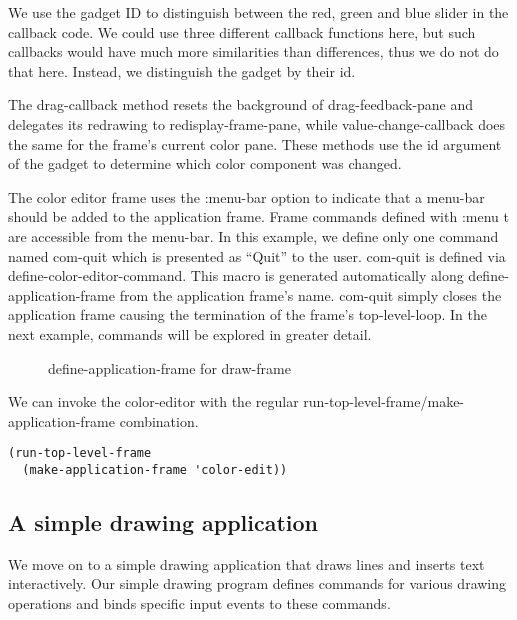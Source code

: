 \documentclass[twocolumn,a4paper]{article}
\newcommand {\code}[1]{{\sffamily #1}}
\let\class\code
\let\method\code
\let\variable\code
\let\macro\code
\let\keyword\code
\begin{document}
We use the gadget ID to distinguish between the red, green and blue
slider in the callback code. We could use three different callback
functions here, but such callbacks would have much more similarities
than differences, thus we do not do that here. Instead, we distinguish
the gadget by their \variable{id}.

The \method{drag-callback} method resets the background of
\variable{drag-feedback-pane} and delegates its redrawing to
\method{redisplay-frame-pane}, while \method{value-change-callback}
does the same for the frame's current color pane. These methods use
the \variable{id} argument of the gadget to determine which color
component was changed.

The color editor frame uses the \keyword{:menu-bar} option to indicate
that a menu-bar should be added to the application frame. Frame
commands defined with \code{:menu t} are accessible from the
menu-bar. In this example, we define only one command named
\code{com-quit} which is presented as ``Quit'' to the
user. \code{com-quit} is defined via
\macro{define-color-editor-command}. This macro is generated
automatically along \macro{define-application-frame} from the
application frame's name. \code{com-quit} simply closes the
application frame causing the termination of the frame's
top-level-loop. In the next example, commands will be explored in
greater detail.

\begin{figure*}[t] \lstset{style=framestyle}

\caption{define-application-frame for
\class{draw-frame}}\label{fig-draw-defapp}\label{fig-draw-handlerepaint}
\end{figure*}

We can invoke the color-editor with the regular
\method{run-top-level-frame}/\method{make-application-frame}
combination.  
\lstset{style=inlinestyle}
\begin{lstlisting}
(run-top-level-frame 
  (make-application-frame 'color-edit))
\end{lstlisting}


\subsection{A simple drawing application}

We move on to a simple drawing application that draws
lines and inserts text interactively. Our simple drawing program
defines commands for various drawing operations and binds specific
input events to these commands.
\end{document}
